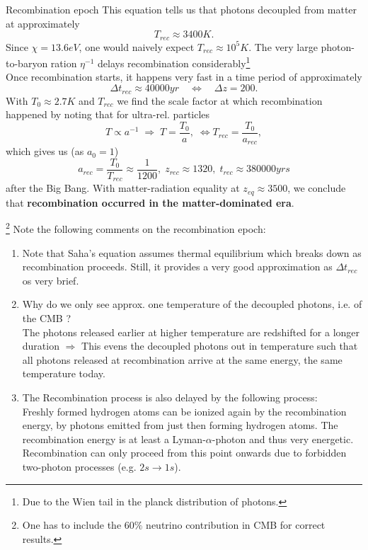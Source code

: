 \begin{mybox}{Recombination epoch}
	This equation tells us that photons decoupled from matter at approximately
	\begin{equation}
	T_{rec} \approx 3400K.
	\end{equation}
	Since $\chi=13.6 eV$, one would naively expect $T_{rec} \approx10^5 K$. The very large photon-to-baryon ration $\eta^{-1}$ delays recombination considerably\footnote{Due to the Wien tail in the planck distribution of photons.}\\
	Once recombination starts, it happens very fast in a time period of approximately
	\begin{equation}
		\Delta t_{rec} \approx 40000 yr \quad \Leftrightarrow \quad \Delta z = 200.
	\end{equation}
	With $T_0 \approx 2.7K$ and $T_{rec}$ we find the scale factor at which recombination happened by noting that for ultra-rel. particles
	\begin{equation}
		T\propto a^{-1} \; \Rightarrow \; T =\frac{T_0}{a},\;\Leftrightarrow T_{rec} = \frac{T_0}{a_{rec}},
	\end{equation}
	which gives us (as $a_0=1$)
	\begin{equation}
		a_{rec} = \frac{T_0}{T_{rec}} \approx \frac{1}{1200}, \; z_{rec} \approx 1320, \; t_{rec} \approx 380000yrs
	\end{equation}
	after the Big Bang. With matter-radiation equality at $z_{eq} \approx 3500$, we conclude that \textbf{recombination occurred in the matter-dominated era}.
\end{mybox}\footnote{One has to include the $60\%$ neutrino contribution in CMB for correct results.}
Note the following comments on the recombination epoch:
\begin{enumerate} 
\item Note that Saha's equation assumes thermal equilibrium which breaks down as recombination proceeds. Still, it provides a very good approximation as $\Delta t_{rec}$ os very brief.
\item 
Why do we only see approx. one temperature of the decoupled photons, i.e. of the CMB ?\\
The photons released earlier at higher temperature are redshifted for a longer duration $\Rightarrow$ This evens the decoupled photons out in temperature such that all photons released at recombination arrive at the same energy, the same temperature today.
\item 
The Recombination process is also delayed by the following process:\\
Freshly formed hydrogen atoms can be ionized again by the recombination energy, by photons emitted from just then forming hydrogen atoms. The recombination energy is at least a Lyman-$\alpha$-photon and thus very energetic. Recombination can only proceed from this point onwards due to forbidden two-photon processes (e.g. $2s\rightarrow1s$).
\end{enumerate}
